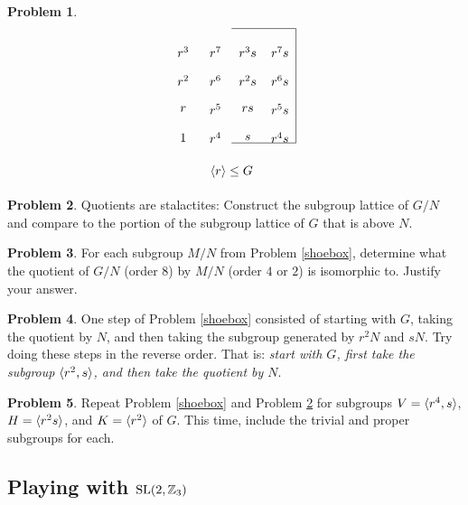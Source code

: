\documentclass[12pt]{article}
\theoremstyle{definition} %
\newtheorem{problem}{Problem}
\begin{document}
\begin{problem}
\[\begin{tikzpicture}[xscale=.9]
\begin{scope}[shift={(12,0)}]
        \draw[thin] (2,0) to (4,0);
        \draw[thin] (2,3.2) to (4,3.2);
        \draw[thin] (4,0) to (4,3.2);
        \node at (.5,.15) {$1$};
        \node at (1.5,.15) {$r^4$};
        \node at (2.5,.15) {$s$};
        \node at (3.5,.15) {$r^4s$};
        \node at (.5,.95) {$r$};
        \node at (1.5,.95) {$r^5$};
        \node at (2.5,.95) {$rs$};
        \node at (3.5,.95) {$r^5s$};
        \node at (.5,1.75) {$r^2$};
        \node at (1.5,1.75) {$r^6$};
        \node at (2.5,1.75) {$r^2s$};
        \node at (3.5,1.75) {$r^6s$};
        \node at (.5,2.55) {$r^3$};
        \node at (1.5,2.55) {$r^7$};
        \node at (2.5,2.55) {$r^3s$};
        \node at (3.5,2.55) {$r^7s$};
        \node at (2,-.8) {$\<r\>\leq G$};
      \end{scope}
    \end{tikzpicture}
    \] \vspace{-9mm}
\end{problem}

\begin{problem}\label{lattice}
  Quotients are stalactites: Construct the subgroup lattice of $G/N$ and compare to the portion of the subgroup lattice of $G$ that is above $N$.
\end{problem}

\begin{problem}
  For each subgroup $M/N$ from Problem \ref{shoebox}, determine what the quotient of $G/N$ (order $8$) by $M/N$ (order $4$ or $2$) is isomorphic to. Justify your answer.
\end{problem}

\begin{problem}
  One step of Problem \ref{shoebox} consisted of starting with $G$, taking the quotient by $N$, and then taking the subgroup generated by $r^2N$ and $sN$. Try doing these steps in the reverse order. That is: \emph{start with $G$, first take the subgroup $\langle r^2,s\rangle$, and then take the quotient by $N$}.  
\end{problem}

\begin{problem}
  Repeat Problem \ref{shoebox} and Problem \ref{lattice} for subgroups $V=\langle r^4,s\rangle$, $H=\langle r^2s\rangle$, and $K=\langle r^2\rangle$ of $G$. This time, include the trivial and proper subgroups for each.
\end{problem}


\subsection*{Playing with $\operatorname{SL}(2, \mathbb{Z}_3)$}
\end{document}
